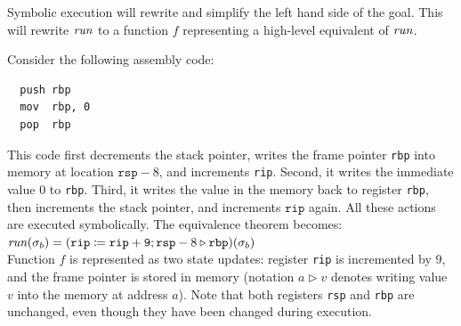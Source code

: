 Symbolic execution will rewrite and simplify the left hand side of the goal.
This will rewrite $\mathit{run}$ to a function $f$ representing a high-level equivalent of $\mathit{run}$.
\begin{example}\label{ex:push_pop}
Consider the following assembly code:
\begin{lstlisting}
  push rbp
  mov  rbp, 0
  pop  rbp
\end{lstlisting}
This code first decrements the stack pointer, writes the frame pointer \texttt{rbp} into memory at location $\mathtt{rsp} - 8$, and increments \texttt{rip}.
Second, it writes the immediate value $0$ to \texttt{rbp}.
Third, it writes the value in the memory back to register \texttt{rbp}, then increments the stack pointer, and increments $\texttt{rip}$ again.
All these actions are executed symbolically.
The equivalence theorem becomes:
\\[1em]
	\mbox{\hspace{5ex}} $\mathit{run}(\sigma_b) = (\mathtt{rip} \coloneqq \mathtt{rip + 9} ; \mathtt{rsp} - 8 \triangleright \mathtt{rbp})(\sigma_b)$
\\[1em]
Function $f$ is represented as two state updates: register \texttt{rip} is incremented by $9$, and the frame pointer is stored in memory (notation $a \triangleright v$ denotes writing value $v$ into the memory at address $a$).
Note that both registers \texttt{rsp} and \texttt{rbp} are unchanged, even though they have been changed during execution.
\end{example}

